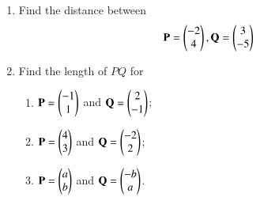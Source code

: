 
\renewcommand{\theequation}{\theenumi}
\begin{enumerate}[label=\arabic*.,ref=\thesubsection.\theenumi]


\item Find the distance between 
\begin{align}
\mathbf{P} = \begin{pmatrix}-2\\4\end{pmatrix}, \mathbf{Q} = \begin{pmatrix}3\\-5\end{pmatrix}
\end{align}

%
\item
Find the length of $PQ$ for
\begin{enumerate}
\item $\mathbf{P}=\begin{pmatrix}-1\\1\end{pmatrix}$ and $\mathbf{Q}=\begin{pmatrix}2\\-1\end{pmatrix}$;
\item $\mathbf{P}=\begin{pmatrix}4\\3\end{pmatrix}$ and $\mathbf{Q}=\begin{pmatrix}-2\\2\end{pmatrix}$;
\item $\mathbf{P}=\begin{pmatrix}a\\b\end{pmatrix}$ and $\mathbf{Q}=\begin{pmatrix}-b\\a\end{pmatrix}$.
\end{enumerate}


\end{enumerate}
